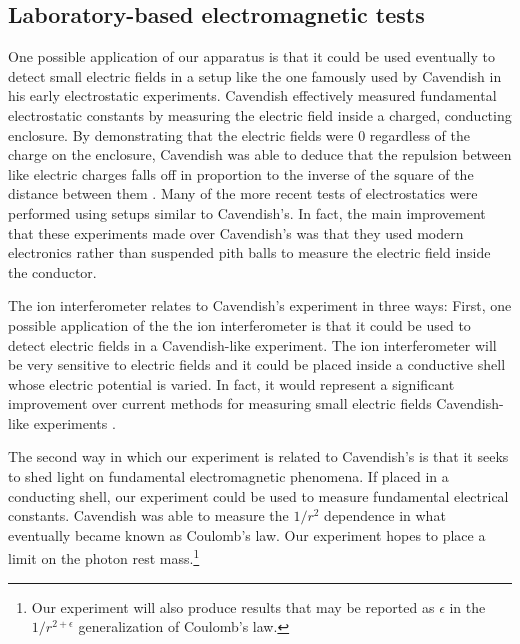 \subsection{Laboratory-based electromagnetic tests}

One possible application of our apparatus is that it could be used eventually to detect small electric fields in a setup like the one famously used by Cavendish in his early electrostatic experiments. Cavendish effectively measured fundamental electrostatic constants by measuring the electric field inside a charged, conducting enclosure. By demonstrating that the electric fields were 0 regardless of the charge on the enclosure, Cavendish was able to deduce that the repulsion between like electric charges falls off in proportion to the inverse of the square of the distance between them \cite{geodude}. Many of the more recent tests of electrostatics were performed using setups similar to Cavendish's\cite{jackson}.  In fact, the main improvement that these experiments made over Cavendish's was that they used modern electronics rather than suspended pith balls to measure the electric field inside the conductor.

The ion interferometer relates to Cavendish's experiment in three ways: First, one possible application of the the ion interferometer is that it could be used to detect electric fields in a Cavendish-like experiment. The ion interferometer will be very sensitive to electric fields and it could be placed inside a conductive shell whose electric potential is varied. In fact, it would represent a significant improvement over current methods for measuring small electric fields Cavendish-like experiments \cite{NSFprop}. 

The second way in which our experiment is related to Cavendish's is that it seeks to shed light on fundamental electromagnetic phenomena. If placed in a conducting shell, our experiment could be used to measure fundamental electrical constants. Cavendish was able to measure the $1/r^2$ dependence in what eventually became known as Coulomb's law. Our experiment hopes to place a limit on the photon rest mass.\footnote{Our experiment will also produce results that may be reported as $\epsilon$ in the $1/r^{2+\epsilon}$ generalization of Coulomb's law.}

